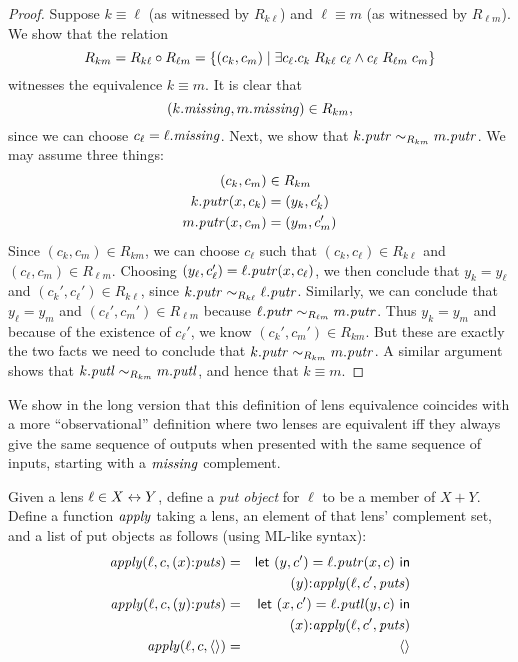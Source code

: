 \begin{defn}[$R$-similarity]
\begin{proof}
Suppose $k \equiv \ell$ (as witnessed by $R_{k\ell}$) and
$\ell \equiv m$ (as witnessed by $R_{\ell m}$). We show that the
relation
\[R_{km} = R_{k\ell}\circ R_{\ell m} = \{(c_k,c_m) \mid \exists c_\ell. c_k \mathrel{R_{k\ell}} c_\ell
\land c_\ell \mathrel{R_{\ell m}} c_m\}\]
witnesses the equivalence $k \equiv m$. It is clear that
\[(k.\mathit{missing},m.\mathit{missing}) \in R_{km},\]
since we can choose $c_\ell = \ell.\mathit{missing}$. Next, we show that $k.\mathit{putr}
\sim_{R_{km}} m.\mathit{putr}$. We may assume three things:
\begin{align*}
    (c_k,c_m) &\in R_{km} \\
    k.\mathit{putr}(x,c_k) &= (y_k, c_k') \\
    m.\mathit{putr}(x,c_m) &= (y_m, c_m')
\end{align*}
Since $(c_k,c_m) \in R_{km}$, we can choose $c_\ell$ such that $(c_k,c_\ell)
\in R_{k\ell}$ and $(c_\ell,c_m) \in R_{\ell m}$. Choosing
$(y_\ell,c_\ell')=\ell.\mathit{putr}(x,c_\ell)$, we then conclude that $y_k=y_\ell$
and $(c_k',c_\ell') \in R_{k\ell}$, since $k.\mathit{putr} \sim_{R_{k\ell}}
\ell.\mathit{putr}$. Similarly, we can conclude that $y_\ell=y_m$ and
$(c_\ell',c_m') \in R_{\ell m}$ because $\ell.\mathit{putr} \sim_{R_{\ell m}}
m.\mathit{putr}$. Thus $y_k=y_m$ and because of the
existence of $c_\ell'$, we know $(c_k',c_m') \in R_{km}$. But these are
exactly the two facts we need to conclude that $k.\mathit{putr} \sim_{R_{km}}
m.\mathit{putr}$. A similar argument shows that $k.\mathit{putl} \sim_{R_{km}} m.\mathit{putl}$, and
hence that $k \equiv m$.
\end{proof}
\fi

\iffull\else We show in the long version that this definition of lens
equivalence coincides with a more ``observational'' definition where two
lenses are equivalent iff they always give the same sequence of outputs when
presented with the same sequence of inputs, starting with a $\mathit{missing}$
complement.  

\fi

\iffull
\begin{defn}
Given a lens $\ell \in X \leftrightarrow Y$, define a \emph{put object} for $\ell$ to
be a member of $X + Y$. Define a function $\mathit{apply}$ taking a lens, an element
of that lens' complement set, and a list of put objects as follows\iftext{}
(using ML-like syntax)\fi:
\begin{eqnarray*}
\mathit{apply}(\ell,c,( x) \mathord{:} \mathit{puts}) &=& \mathsf{let}\  (y,c') = \ell.\mathit{putr}(x,c) \ \mathsf{in} \\
&& ( y) \mathord{:} \mathit{apply}(\ell,c',\mathit{puts}) \\
\mathit{apply}(\ell,c,( y) \mathord{:} \mathit{puts}) &=& \mathsf{let}\  (x,c') = \ell.\mathit{putl}(y,c) \ \mathsf{in} \\
&& ( x) \mathord{:} \mathit{apply}(\ell,c',\mathit{puts}) \\
\mathit{apply}(\ell,c,\left<\right>) &=&  \left<\right>
\end{eqnarray*}
\end{defn}


\end{defn}
